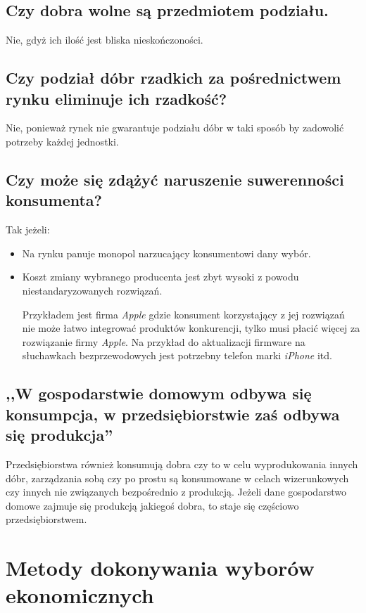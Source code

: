 \documentclass[a4paper,12pt]{article}
\let\oldsection\section
\renewcommand\section{\clearpage\oldsection}
\begin{document}
\subsection{Czy dobra wolne są przedmiotem podziału.}

Nie, gdyż ich ilość jest bliska nieskończoności.

\subsection{Czy podział dóbr rzadkich za pośrednictwem rynku eliminuje ich rzadkość?}

Nie, ponieważ rynek nie gwarantuje podziału dóbr w taki sposób by zadowolić potrzeby każdej jednostki.

\subsection{Czy może się zdążyć naruszenie suwerenności konsumenta?}

Tak jeżeli:

\begin{itemize}
	\item Na rynku panuje monopol narzucający konsumentowi dany wybór.
	\item Koszt zmiany wybranego producenta jest zbyt wysoki z powodu niestandaryzowanych rozwiązań.

	      Przykładem jest firma \emph{Apple} gdzie konsument korzystający z jej rozwiązań nie może łatwo integrować produktów konkurencji, tylko musi płacić więcej za rozwiązanie firmy \emph{Apple}. Na przykład do aktualizacji firmware na słuchawkach bezprzewodowych jest potrzebny telefon marki \emph{iPhone} itd.
\end{itemize}

\subsection{,,W gospodarstwie domowym odbywa się konsumpcja, w przedsiębiorstwie zaś odbywa się produkcja''}

Przedsiębiorstwa również konsumują dobra czy to w celu wyprodukowania innych dóbr, zarządzania sobą czy po prostu są konsumowane w celach wizerunkowych czy innych nie związanych bezpośrednio z produkcją.
Jeżeli dane gospodarstwo domowe zajmuje się produkcją jakiegoś dobra, to staje się częściowo przedsiębiorstwem.

\section{Metody dokonywania wyborów ekonomicznych}
\end{document}
